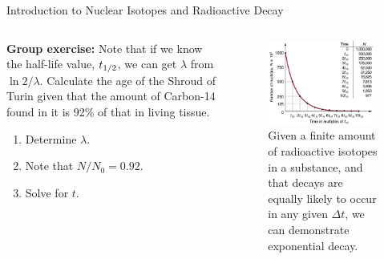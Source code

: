 \documentclass{beamer}
\begin{document}
\begin{frame}{Introduction to Nuclear Isotopes and Radioactive Decay}
\begin{columns}[T]
\begin{column}{0.5\textwidth}
\small
\textbf{Group exercise:} Note that if we know the half-life value, $t_{\rm 1/2}$, we can get $\lambda$ from $\ln 2/\lambda$. Calculate the age of the Shroud of Turin given that the amount of Carbon-14 found in it is 92\% of that in living tissue.
\begin{enumerate}
\item Determine $\lambda$.
\item Note that $N/N_0 = 0.92$.
\item Solve for $t$.
\end{enumerate}
\end{column}
\begin{column}{0.5\textwidth}
\begin{figure}
\centering
\includegraphics[width=0.95\textwidth]{figures/half-life.png}
\caption{\label{fig:radio12} Given a finite amount of radioactive isotopes in a substance, and that decays are equally likely to occur in any given $\Delta t$, we can demonstrate exponential decay.}
\end{figure}
\end{column}
\end{columns}
\end{frame}
\end{document}
